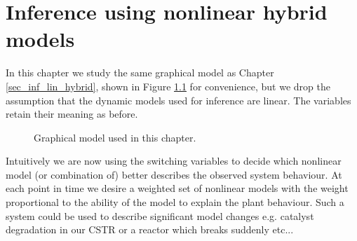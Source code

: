 \chapter{Inference using nonlinear hybrid models}
\label{sec_inf_spf}
In this chapter we study the same graphical model as Chapter \ref{sec_inf_lin_hybrid}, shown in Figure \ref{fig_hybridmod2} for convenience, but we drop the assumption that the dynamic models used for inference are linear. The variables retain their meaning as before.     
\begin{figure}[H] 
\centering
{}
\caption{Graphical model used in this chapter.}
\label{fig_hybridmod2}
\end{figure}
Intuitively we are now using the switching variables to decide which nonlinear model (or combination of) better describes the observed system behaviour. At each point in time we desire a weighted set of nonlinear models with the weight proportional to the ability of the model to explain the plant behaviour. Such a system could be used to describe significant model changes e.g. catalyst degradation in our CSTR or a reactor which breaks suddenly etc... 

